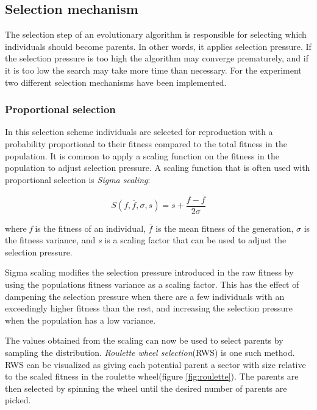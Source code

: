 \subsection{Selection mechanism}
The selection step of an evolutionary algorithm is responsible for selecting which individuals should become parents.
In other words, it applies selection pressure.
If the selection pressure is too high the algorithm may converge prematurely, and if it is too low the search may take more time than necessary.
For the experiment two different selection mechanisms have been implemented.
		
\subsubsection{Proportional selection}
In this selection scheme individuals are selected for reproduction with a probability proportional to their fitness compared to the total fitness in the population.
It is common to apply a scaling function on the fitness in the population to adjust selection pressure.
A scaling function that is often used with proportional selection is \emph{Sigma scaling}\cite{goh_sexual_2003}:
		
\begin{equation}
		S(f, \overline{f}, \sigma, s) = s + \frac{f - \overline{f} }{2\sigma}
\end{equation}
		
where \emph{f} is the fitness of an individual, $\overline{f}$ is the mean fitness of the generation, $\sigma$ is the fitness variance, and \emph{s} is a scaling factor that can be used to adjust the selection pressure.
		
Sigma scaling modifies the selection pressure introduced in the raw fitness by using the populations fitness variance as a scaling factor.
This has the effect of dampening the selection pressure when there are a few individuals with an exceedingly higher fitness than the rest, and increasing the selection pressure when the population has a low variance.
		
The values obtained from the scaling can now be used to select parents by sampling the distribution.
\emph{Roulette wheel selection}(RWS)\cite{goh_sexual_2003}  is one such method.
RWS can be visualized as giving each potential parent a sector with size relative to the scaled fitness in the roulette wheel(figure \ref{fig:roulette}).
The parents are then selected by spinning the wheel until the desired number of parents are picked.
		

